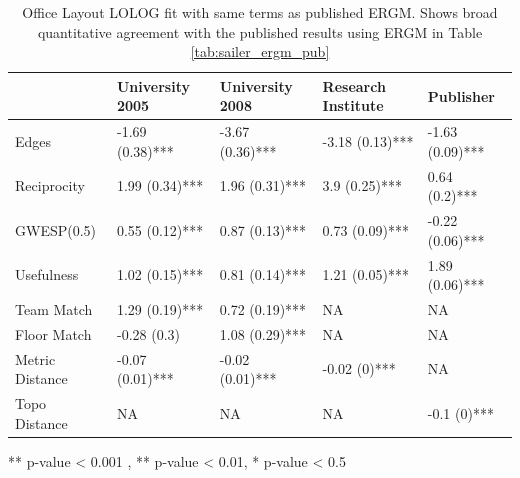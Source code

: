 \documentclass[
]{statsoc}
\begin{document}
\begin{table}

\caption{\label{tab:unnamed-chunk-3}\label{tab:sailer_lolog_pub}Office Layout LOLOG fit with same terms as published ERGM. Shows broad quantitative agreement with the published results using ERGM in Table \ref{tab:sailer_ergm_pub}}
\centering
\begin{threeparttable}
\begin{tabular}[t]{lllll}
\toprule
  & University 2005 & University 2008 & Research Institute & Publisher\\
\midrule
\rowcolor{gray!6}  Edges & -1.69 (0.38)*** & -3.67 (0.36)*** & -3.18 (0.13)*** & -1.63 (0.09)***\\
Reciprocity & 1.99 (0.34)*** & 1.96 (0.31)*** & 3.9 (0.25)*** & 0.64 (0.2)***\\
\rowcolor{gray!6}  GWESP(0.5) & 0.55 (0.12)*** & 0.87 (0.13)*** & 0.73 (0.09)*** & -0.22 (0.06)***\\
Usefulness & 1.02 (0.15)*** & 0.81 (0.14)*** & 1.21 (0.05)*** & 1.89 (0.06)***\\
\rowcolor{gray!6}  Team Match & 1.29 (0.19)*** & 0.72 (0.19)*** & NA & NA\\
\addlinespace
Floor Match & -0.28 (0.3) & 1.08 (0.29)*** & NA & NA\\
\rowcolor{gray!6}  Metric Distance & -0.07 (0.01)*** & -0.02 (0.01)*** & -0.02 (0)*** & NA\\
Topo Distance & NA & NA & NA & -0.1 (0)***\\
\bottomrule
\end{tabular}
\begin{tablenotes}
\item *** p-value < 0.001 , ** p-value < 0.01, * p-value < 0.5
\end{tablenotes}
\end{threeparttable}
\end{table}
\end{document}
